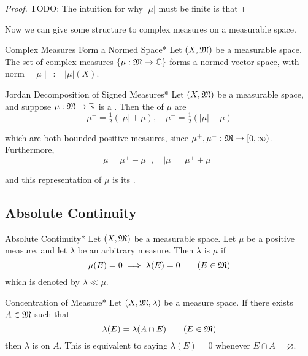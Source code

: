 \begin{proof}
    TODO: The intuition for why \(|\mu|\) must be finite is that 
\end{proof}

Now we can give some structure to complex measures on a measurable space. 

\begin{definition}{Complex Measures Form a Normed Space}*
    Let \((X, \mathfrak{M})\) be a measurable space. The set of complex measures \(\{\mu : \mathfrak{M} \to \mathbb{C}\}\) forms a normed vector space, with norm \(\|\mu\| := |\mu|(X)\). 
\end{definition}

\begin{definition}{Jordan Decomposition of Signed Measures}*
    Let \((X, \mathfrak{M})\) be a measurable space, and suppose \(\mu : \mathfrak{M} \to \mathbb{R}\) is a . Then the  of \(\mu\) are 
    \[
        \mu^+ = \tfrac{1}{2}(|\mu| + \mu), 
        \quad 
        \mu^- = \tfrac{1}{2}(|\mu| - \mu)
    \]

    which are both bounded positive measures, since \(\mu^+, \mu^- : \mathfrak{M} \to [0, \infty)\). Furthermore, 
    \[
        \mu = \mu^+ - \mu^-, 
        \quad
        |\mu| = \mu^+ + \mu^-
    \]

    and this representation of \(\mu\) is its . 
\end{definition}

\subsection{Absolute Continuity}

\begin{definition}{Absolute Continuity}*
    Let \((X, \mathfrak{M})\) be a measurable space. Let \(\mu\) be a positive measure, and let \(\lambda\) be an arbitrary measure. Then \(\lambda\) is  \(\mu\) if 
    \[
        \mu(E) = 0 \implies \lambda(E) = 0
        \qquad (E \in \mathfrak{M})
    \]
    which is denoted by \(\lambda \ll \mu\). 
\end{definition}

\begin{definition}{Concentration of Measure}*
    Let \((X, \mathfrak{M}, \lambda)\) be a measure space. If there exists \(A \in \mathfrak{M}\) such that
    \[
        \lambda(E) = \lambda(A \cap E)
        \qquad (E \in \mathfrak{M})
    \]
    then \(\lambda\) is  on \(A\). This is equivalent to saying \(\lambda(E) = 0\) whenever \(E \cap A = \varnothing\).
\end{definition}

